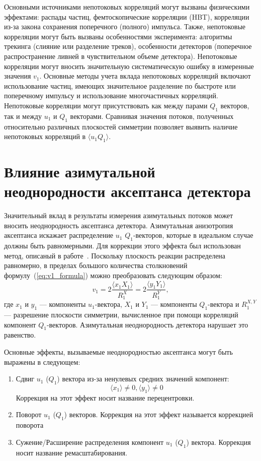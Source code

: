 Основными источниками непотоковых корреляций могут вызваны физическими эффектами: распады частиц, фемтоскопические корреляции (HBT), корреляции из-за закона сохранения поперечного (полного) импульса.
Также, непотоковые корреляции могут быть вызваны особенностями эксперимента: алгоритмы трекинга (слияние или разделение треков), особенности детекторов (поперечное распространение ливней в чувствительном объеме детектора). 
Непотоковые корреляции могут вносить значительную систематическую ошибку в измеренные значения $v_1$.
Основные методы учета вклада непотоковых корреляций включают использование частиц, имеющих значительное разделение по быстроте или поперечному импульсу и использование многочастичных корреляций.
Непотоковые корреляции могут присутствовать как между парами $Q_1$ векторов, так и между $u_1$ и $Q_1$ векторами.
Сравнивая значения потоков, полученных относительно различных плоскостей симметрии позволяет выявить наличие непотоковых корреляций в $\langle u_1 Q_1 \rangle$.

\section{Влияние азимутальной неоднородности аксептанса детектора}

Значительный вклад в результаты измерения азимутальных потоков может вносить неоднородность аксептанса детектора. 
Азимутальная анизотропия аксептанса искажает распределение $u_1$ $Q_1$-векторов, которые в идеальном случае должны быть равномерными. 
Для коррекции этого эффекта был использован метод, описаный в работе~\cite{Selyuzhenkov:2007zi}.
Поскольку плоскость реакции распределена равномерно, в пределах большого количества столкновений формулу~(\ref{eq:v1_formula}) можно преобразовать следующим образом:
%
\begin{equation}
    v_1 =  2\frac{ \langle x_1 X_1 \rangle }{R_1^X} = 2\frac{ \langle y_1 Y_1 \rangle }{R_1^Y},
    \label{eq:v1_formula}
\end{equation}
%
где $x_1$ и $y_1$ --- компоненты $u_1$-вектора, $X_1$ и $Y_1$ --- компоненты $Q_1$-вектора и $R_1^{X,Y}$ --- разрешение плоскости симметрии, вычисленное при помощи корреляций компонент $Q_1$-векторов.
Азимутальная неоднородность детектора нарушает это равенство.

Основные эффекты, вызываемые неоднородностью аксептанса могут быть выражены в следующем:
\begin{enumerate}
    \item Сдвиг $u_1$ ($Q_1$) вектора из-за ненулевых средних значений компонент:
    \begin{equation}
        \langle x_1 \rangle \ne 0, \langle y_1 \rangle \ne 0
    \end{equation}
    Коррекция на этот эффект носит название перецентровки.
    \item Поворот $u_1$ ($Q_1$) векторов. Коррекция на этот эффект называется коррекцией поворота
    \item Сужение/Расширение распределения компонент $u_1$ ($Q_1$) вектора. Коррекция носит название ремасштабирования.
\end{enumerate}

